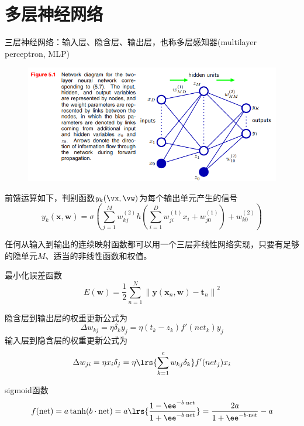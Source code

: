 
\section{多层神经网络} %

三层神经网络：输入层、隐含层、输出层，也称多层感知器(multilayer perceptron, MLP)
\begin{figure}[H]
\centering
\includegraphics[width=0.8\linewidth]{fig/forward_propagation.png}
\end{figure}

前馈运算如下，判别函数$y_k(\vx,\vw)$为每个输出单元产生的信号
\[y_{k}(\mathbf{x}, \mathbf{w})=\sigma\left(\sum_{j=1}^{M} w_{k j}^{(2)} h\left(\sum_{i=1}^{D} w_{j i}^{(1)} x_{i}+w_{j 0}^{(1)}\right)+w_{k 0}^{(2)}\right)\]

任何从输入到输出的连续映射函数都可以用一个三层非线性网络实现，只要有足够的隐单元$M$、适当的非线性函数和权值。

最小化误差函数
\[E(\mathbf{w})=\frac{1}{2} \sum_{n=1}^{N}\left\|\mathbf{y}\left(\mathbf{x}_{n}, \mathbf{w}\right)-\mathbf{t}_{n}\right\|^{2}\]

隐含层到输出层的权重更新公式为
\[\Delta w_{kj}=\eta\delta_k y_j=\eta(t_k-z_k)f'(net_k)y_j\]
输入层到隐含层的权重更新公式为
\[\Delta w_{ji}=\eta x_i\delta_j=\eta\lrs{\sum_{k=1}^c w_{kj}\delta_k}f'(net_j)x_i\]

sigmoid函数
\[f(\text{net})=a\tanh(b\cdot\text{net})=a\lrs{\frac{1-\ee^{-b\cdot \text{net}}}{1+\ee^{-b\cdot\text{net}}}}=\frac{2a}{1+\ee^{-b\cdot\text{net}}}-a\]